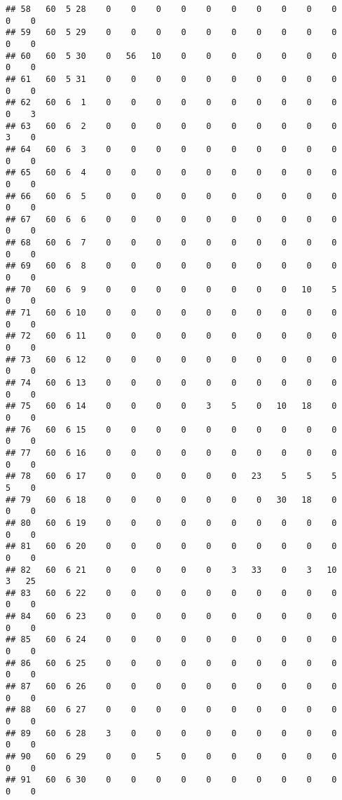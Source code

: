 \documentclass[]{article}
\begin{document}
\begin{verbatim}
## 58   60  5 28    0    0    0    0    0    0    0    0    0    0    0    0
## 59   60  5 29    0    0    0    0    0    0    0    0    0    0    0    0
## 60   60  5 30    0   56   10    0    0    0    0    0    0    0    0    0
## 61   60  5 31    0    0    0    0    0    0    0    0    0    0    0    0
## 62   60  6  1    0    0    0    0    0    0    0    0    0    0    0    3
## 63   60  6  2    0    0    0    0    0    0    0    0    0    0    3    0
## 64   60  6  3    0    0    0    0    0    0    0    0    0    0    0    0
## 65   60  6  4    0    0    0    0    0    0    0    0    0    0    0    0
## 66   60  6  5    0    0    0    0    0    0    0    0    0    0    0    0
## 67   60  6  6    0    0    0    0    0    0    0    0    0    0    0    0
## 68   60  6  7    0    0    0    0    0    0    0    0    0    0    0    0
## 69   60  6  8    0    0    0    0    0    0    0    0    0    0    0    0
## 70   60  6  9    0    0    0    0    0    0    0    0   10    5    0    0
## 71   60  6 10    0    0    0    0    0    0    0    0    0    0    0    0
## 72   60  6 11    0    0    0    0    0    0    0    0    0    0    0    0
## 73   60  6 12    0    0    0    0    0    0    0    0    0    0    0    0
## 74   60  6 13    0    0    0    0    0    0    0    0    0    0    0    0
## 75   60  6 14    0    0    0    0    3    5    0   10   18    0    0    0
## 76   60  6 15    0    0    0    0    0    0    0    0    0    0    0    0
## 77   60  6 16    0    0    0    0    0    0    0    0    0    0    0    0
## 78   60  6 17    0    0    0    0    0    0   23    5    5    5    5    0
## 79   60  6 18    0    0    0    0    0    0    0   30   18    0    0    0
## 80   60  6 19    0    0    0    0    0    0    0    0    0    0    0    0
## 81   60  6 20    0    0    0    0    0    0    0    0    0    0    0    0
## 82   60  6 21    0    0    0    0    0    3   33    0    3   10    3   25
## 83   60  6 22    0    0    0    0    0    0    0    0    0    0    0    0
## 84   60  6 23    0    0    0    0    0    0    0    0    0    0    0    0
## 85   60  6 24    0    0    0    0    0    0    0    0    0    0    0    0
## 86   60  6 25    0    0    0    0    0    0    0    0    0    0    0    0
## 87   60  6 26    0    0    0    0    0    0    0    0    0    0    0    0
## 88   60  6 27    0    0    0    0    0    0    0    0    0    0    0    0
## 89   60  6 28    3    0    0    0    0    0    0    0    0    0    0    0
## 90   60  6 29    0    0    5    0    0    0    0    0    0    0    0    0
## 91   60  6 30    0    0    0    0    0    0    0    0    0    0    0    0

\end{verbatim}
\end{document}
